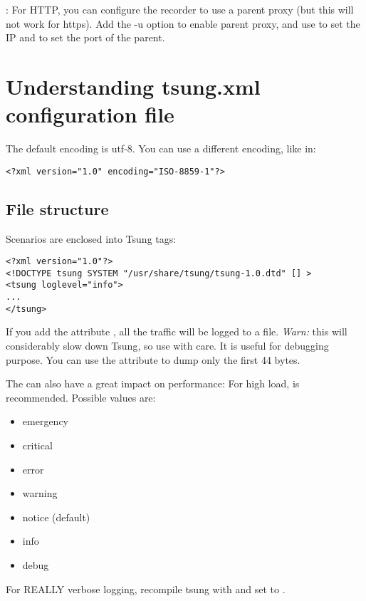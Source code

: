 \documentclass{TSUNG-en}
\begin{document}
: For HTTP, you can configure the recorder to
use a parent proxy (but this will not work for https). Add the -u
option to enable parent proxy, and use  to set
the IP and  to set the port of the parent.




\section{Understanding tsung.xml configuration file}

The default encoding is utf-8.  You can use a different encoding, like in:

 \begin{Verbatim}
<?xml version="1.0" encoding="ISO-8859-1"?>
 \end{Verbatim}

\subsection{File structure}

 Scenarios are enclosed into Tsung tags:

 \begin{Verbatim}
<?xml version="1.0"?>
<!DOCTYPE tsung SYSTEM "/usr/share/tsung/tsung-1.0.dtd" [] >
<tsung loglevel="info">
...
</tsung>
 \end{Verbatim}

 If you add the attribute , all the
 traffic will be logged to a file. \emph{Warn:} this will considerably
 slow down Tsung, so use with care. It is useful for debugging
 purpose. You can use the attribute  to
 dump only the first 44 bytes.

 The  can also have a great impact on performance:
 For high load,  is recommended.
 Possible values are:

\begin{itemize}
\item emergency
\item critical
\item error
\item warning
\item notice (default)
\item info
\item debug
\end{itemize}

For REALLY verbose logging, recompile tsung with 
and set  to .
\end{document}
